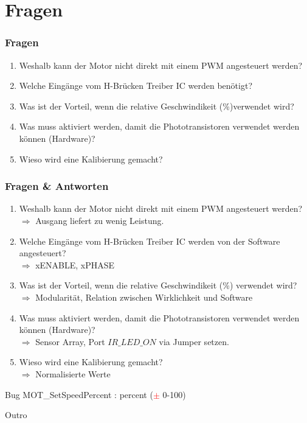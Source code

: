 \documentclass[usenames, dvipsnames]{beamer}
\begin{document}
\section{Fragen} %
\begin{frame}
	\frametitle{Fragen}
	\begin{enumerate}
		\item{Weshalb kann der Motor nicht direkt mit einem PWM angesteuert werden?}
		\item{Welche Eingänge vom H-Brücken Treiber IC werden benötigt?}
		\item{Was ist der Vorteil, wenn die relative Geschwindikeit (\%)verwendet wird?}
		\item{Was muss aktiviert werden, damit die Phototransistoren verwendet werden können (Hardware)?}
		\item{Wieso wird eine Kalibierung gemacht?}
	\end{enumerate}
\end{frame}
\begin{frame}
	\frametitle{Fragen \& Antworten}
	\begin{enumerate}
		\item{Weshalb kann der Motor nicht direkt mit einem PWM angesteuert werden?}
		\\$\Rightarrow$ Ausgang liefert zu wenig Leistung.
		\item{Welche Eingänge vom H-Brücken Treiber IC werden von der Software angesteuert?}
		\\$\Rightarrow$ xENABLE, xPHASE
		\item{Was ist der Vorteil, wenn die relative Geschwindikeit (\%) verwendet wird?}
		\\$\Rightarrow$ Modularität, Relation zwischen Wirklichkeit und Software
		\item{Was muss aktiviert werden, damit die Phototransistoren verwendet werden können (Hardware)?}
		\\$\Rightarrow$ Sensor Array, Port $IR\_LED\_ON$ via Jumper setzen.
		\item{Wieso wird eine Kalibierung gemacht?}
		\\$\Rightarrow$ Normalisierte Werte
	\end{enumerate}
\end{frame}
\begin{frame}
	\begin{exampleblock}{Bug}
	\centering
		MOT\_SetSpeedPercent : percent (\textcolor{red}{$\pm$} 0-100)
	\end{exampleblock}
\end{frame}
\begin{frame}
	\Huge{\centerline{Outro}}
\end{frame}
\end{document}
